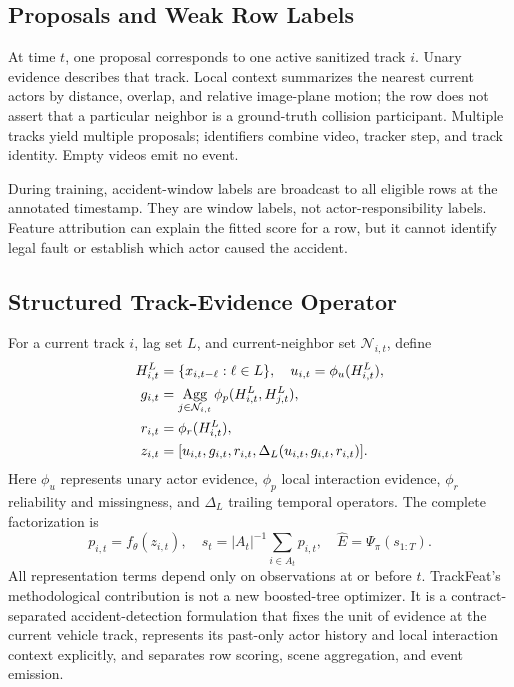 \documentclass[letterpaper]{article}
\begin{document}
\subsection{Proposals and Weak Row Labels}
At time $t$, one proposal corresponds to one active sanitized track $i$. Unary evidence describes that track. Local context summarizes the nearest current actors by distance, overlap, and relative image-plane motion; the row does not assert that a particular neighbor is a ground-truth collision participant. Multiple tracks yield multiple proposals; identifiers combine video, tracker step, and track identity. Empty videos emit no event.

During training, accident-window labels are broadcast to all eligible rows at the annotated timestamp. They are window labels, not actor-responsibility labels. Feature attribution can explain the fitted score for a row, but it cannot identify legal fault or establish which actor caused the accident.

\subsection{Structured Track-Evidence Operator}
For a current track $i$, lag set $L$, and current-neighbor set $\mathcal{N}_{i,t}$, define
\begin{align}
H_{i,t}^{L}&=\{x_{i,t-\ell}:\ell\in L\},\quad
u_{i,t}=\phi_u(H_{i,t}^{L}),\notag\\
g_{i,t}&=\underset{j\in\mathcal{N}_{i,t}}{\operatorname{Agg}}\,
\phi_p(H_{i,t}^{L},H_{j,t}^{L}),\\
r_{i,t}&=\phi_r(H_{i,t}^{L}),\notag\\
z_{i,t}&=[u_{i,t},g_{i,t},r_{i,t},\Delta_L(u_{i,t},g_{i,t},r_{i,t})].\notag
\end{align}
Here $\phi_u$ represents unary actor evidence, $\phi_p$ local interaction evidence, $\phi_r$ reliability and missingness, and $\Delta_L$ trailing temporal operators. The complete factorization is
\begin{equation}
p_{i,t}=f_\theta(z_{i,t}),\quad
s_t=|A_t|^{-1}\!\sum_{i\in A_t}p_{i,t},\quad
\widehat{E}=\Psi_\pi(s_{1:T}).
\label{eq:factorization}
\end{equation}
All representation terms depend only on observations at or before $t$. TrackFeat's methodological contribution is not a new boosted-tree optimizer. It is a contract-separated accident-detection formulation that fixes the unit of evidence at the current vehicle track, represents its past-only actor history and local interaction context explicitly, and separates row scoring, scene aggregation, and event emission.
\end{document}
